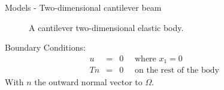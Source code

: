 \documentclass[8pt]{beamer}
\begin{document}
\begin{frame}{Models - Two-dimensional cantilever beam}
\begin{figure}[h!]
                \caption{A cantilever two-dimensional elastic body.}
            \end{figure} 
        
            Boundary Conditions:
            \begin{eqnarray*}
                u & = & 0 \quad \textrm{ where } x_1 = 0\\
                Tn & = & 0 \quad \textrm{ on the rest of the body }
            \end{eqnarray*} With $n$ the outward normal vector to $\Omega$.
        \end{frame}
\end{document}
